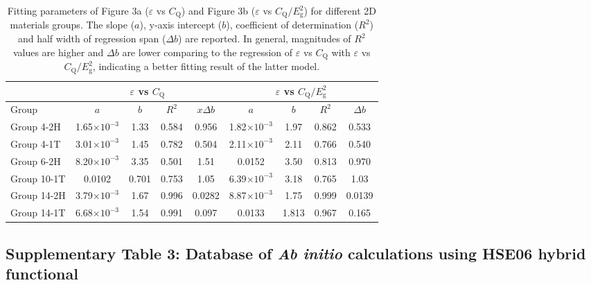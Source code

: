 \documentclass[journal=ancac3,manuscript=article,email=true,hyperref=true,keywords=true]{achemso}
\begin{document}
\begin{table}
\begin{center}
  \begin{tabular}{l|cccc|cccc}
    \hline
    &  \multicolumn{4}{c|}{$\varepsilon$ vs $C_{\mathrm{Q}}$} &
    \multicolumn{4}{c}{$\varepsilon$ vs $C_{\mathrm{Q}}/E_{\mathrm{g}}^{2}$}\\
    \hline
    Group & \(a\) & \(b\) & \(R^{2}\) & \(x\Delta b\) & \(a\) & \(b\) & \(R^{2}\) & \(\Delta b\)\\
    \hline
    Group 4-2H & 1.65$\times10^{-3}$ & 1.33 & 0.584 & 0.956 & 1.82$\times10^{-3}$ & 1.97 & 0.862 & 0.533\\
    Group 4-1T & 3.01$\times10^{-3}$ & 1.45 & 0.782 & 0.504 & 2.11$\times10^{-3}$ & 2.11 & 0.766 & 0.540\\
    Group 6-2H & 8.20$\times10^{-3}$ & 3.35 & 0.501 & 1.51 & 0.0152 & 3.50 & 0.813 & 0.970\\
    Group 10-1T & 0.0102 & 0.701 & 0.753 & 1.05 & 6.39$\times10^{-3}$ & 3.18 & 0.765 & 1.03\\
    Group 14-2H & 3.79$\times10^{-3}$ & 1.67 & 0.996 & 0.0282 & 8.87$\times10^{-3}$ & 1.75 & 0.999 & 0.0139\\
    Group 14-1T & 6.68$\times10^{-3}$ & 1.54 & 0.991 & 0.097 & 0.0133 & 1.813 & 0.967 & 0.165\\
    \hline
  \end{tabular}
  \caption{Fitting parameters of Figure 3a ($\varepsilon$ vs
    $C_{\mathrm{Q}}$) and Figure 3b ($\varepsilon$ vs
    $C_{\mathrm{Q}}/E_{\mathrm{g}}^{2}$) for different 2D materials
    groups. The slope ($a$), y-axis intercept ($b$), coefficient of
    determination ($R^{2}$) and half width of regression span
    ($\Delta b$) are reported. In general, magnitudes of $R^{2}$ values are
    higher and $\Delta b$ are lower comparing to the regression of
    $\varepsilon$ vs $C_{\mathrm{Q}}$ with $\varepsilon$ vs
    $C_{\mathrm{Q}}/E_{\mathrm{g}}^2$, indicating a better fitting
    result of the latter model.}
\end{center}
\end{table}

\pagebreak{}

\subsection{Supplementary Table 3: Database of \textit{Ab initio} calculations using HSE06 hybrid functional}

\end{document}
